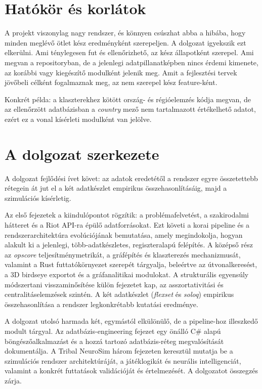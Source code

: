 \section{Hatókör és korlátok}

A projekt viszonylag nagy rendszer, és könnyen csúszhat abba a hibába, hogy minden meglévő ötlet kész eredményként szerepeljen. A dolgozat igyekszik ezt elkerülni. Ami ténylegesen fut és ellenőrizhető, az kész állapotként szerepel. Ami megvan a repositoryban, de a jelenlegi adatpillanatképben nincs érdemi kimenete, az korábbi vagy kiegészítő modulként jelenik meg. Amit a fejlesztési tervek jövőbeli célként fogalmaznak meg, az nem szerepel kész feature-ként.

Konkrét példa: a klaszterekhez kötött ország- és régióelemzés kódja megvan, de az ellenőrzött adatbázisban a \textit{country} mező nem tartalmazott értékelhető adatot, ezért ez a vonal kísérleti modulként van jelölve.

\section{A dolgozat szerkezete}

A dolgozat fejlődési ívet követ: az adatok eredetétől a rendszer egyre összetettebb rétegein át jut el a két adatkészlet empirikus összehasonlításáig, majd a szimulációs kísérletig.

Az első fejezetek a kiindulópontot rögzítik: a problémafelvetést, a szakirodalmi hátteret és a Riot API-ra épülő adatforrásokat. Ezt követi a korai pipeline és a rendszerarchitektúra evolúciójának bemutatása, amely megindokolja, hogyan alakult ki a jelenlegi, több-adatkészletes, regiszteralapú felépítés. A középső rész az \textit{opscore} teljesítménymetrikát, a gráfépítés és klaszterezés mechanizmusát, valamint a Rust futtatókörnyezet szerepét tárgyalja, beleértve az útvonalkeresést, a 3D birdseye exportot és a gráfanalitikai modulokat. A strukturális egyensúly módszertani visszaminősítése külön fejezetet kap, az asszortativitási és centralitáselemzések szintén. A két adatkészlet (\textit{flexset} és \textit{soloq}) empirikus összehasonlítása a rendszer legkonkrétabb kutatási eredménye.

A dolgozat utolsó harmada két, egymástól elkülönülő, de a pipeline-hoz illeszkedő modult tárgyal. Az adatbázis-engineering fejezet egy önálló C\# alapú böngészőalkalmazást és a hozzá tartozó adatbázis-réteg megvalósítását dokumentálja. A Tribal NeuroSim három fejezeten keresztül mutatja be a szimulációs rendszer architektúráját, a játéklogikát és neurális intelligenciát, valamint a konkrét futtatások validációját és értelmezését. A dolgozatot összegzés zárja.
